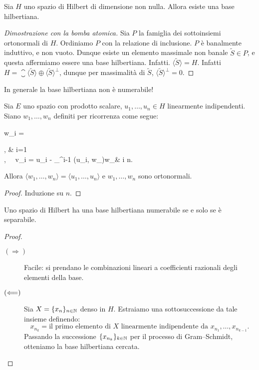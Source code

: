 \begin{theorem}
\label{th:hilb_basis}
	Sia $H$ uno spazio di Hilbert di dimensione non nulla.
	Allora esiste una base hilbertiana.
\end{theorem}
\begin{proof}[Dimostrazione con la bomba atomica]
	Sia $P$ la famiglia dei sottoinsiemi ortonormali di $H$. Ordiniamo $P$ con la relazione di inclusione. $P$ è banalmente induttivo, e non vuoto. Dunque esiste un elemento massimale non banale $\tilde S \in P$, e questa affermiamo essere una base hilbertiana. Infatti. $\langle \tilde S \rangle = H$. Infatti $H = \closure {\langle \tilde S \rangle} \oplus \langle \tilde S \rangle^\perp$, dunque per massimalità di $\tilde S$, $\langle \tilde S \rangle^\perp = 0$.
\end{proof}

\begin{remark}
	In generale la base hilbertiana non è numerabile!
\end{remark}

\begin{lemma}
	Sia $E$ uno spazio con prodotto scalare, $u_1, \ldots, u_n \in H$ linearmente indipendenti. Siano $w_1, \ldots, w_n$ definiti per ricorrenza come segue:
	\begin{eqalign*}
		w_i = \begin{dcases}
			, & i=1\\
			, \ \ v_i = u_i - \sum_{}^{i-1} (u_i, w_\ell)w_\ell & i  \leq n.
		\end{dcases}
	\end{eqalign*}
	Allora $\langle w_1, \ldots, w_n \rangle = \langle u_1, \ldots, u_n \rangle$ e $w_1, \ldots, w_n$ sono ortonormali.
\end{lemma}
\begin{proof}
	Induzione su $n$.
\end{proof}

\begin{theorem}
	Uno spazio di Hilbert ha una base hilbertiana numerabile se e solo se è separabile.
\end{theorem}
\begin{proof}
	\leavevmode
	\begin{description}
		\item[$(\Longrightarrow)$] Facile: si prendano le combinazioni lineari a coefficienti razionali degli elementi della base.
		\item[$(\Longleftarrow)$] Sia $X=\{x_n\}_{n \in \mathbb{N}}$ denso in $H$. Estraiamo una sottosuccessione da tale insieme definendo:
		\begin{equation*}
			x_{n_k} = \text{il primo elemento di $X$ linearmente indipendente da $x_{n_1}, \ldots, x_{n_{k-1}}$}.
		\end{equation*}
		Passando la successione $\{x_{n_k}\}_{k \in \mathbb{N}}$ per il processo di Gram--Schmidt, otteniamo la base hilbertiana cercata.
	\end{description}
\end{proof}

